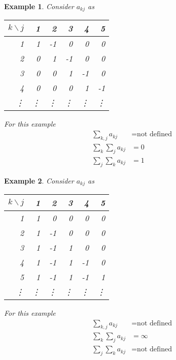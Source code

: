 \documentclass[11pt]{report}
\newtheorem{example}{Example}
\begin{document}
\begin{example}
Consider $a_{kj}$ as
\begin{center}
\begin{tabular}{|r|rrrrr|}
\hline
 $k\backslash j$&1&2&3&4&5\\
\hline
1&1&-1& 0&0&0 \\
2& 0&1&-1 &0&0\\
3& 0& 0&1&-1&0\\
4&0& 0& 0&1&-1\\
\vdots& \vdots&\vdots &\vdots &\vdots&\vdots \\
\hline
\end{tabular}
\end{center}
For this example
\begin{align*}
\sum_{k,j}a_{kj} &= \text{not defined} \\
\sum_k\sum_j a_{kj} &= 0 \\
\sum_j\sum_k a_{kj} &= 1
\end{align*}
\end{example}


\begin{example}
Consider $a_{kj}$ as
\begin{center}
\begin{tabular}{|r|rrrrr|}
\hline
 $k\backslash j$&1&2&3&4&5\\
\hline
1 & 1 &  0 &  0 &   0 &  0 \\
2 & 1 & -1 &  0 &   0 &  0 \\
3 & 1 & -1 &  1 &   0 &  0 \\
4 & 1 & -1 &  1 &  -1 &  0 \\
5 & 1 & -1 &  1 &  -1 &  1 \\
\vdots& \vdots&\vdots &\vdots &\vdots&\vdots \\
\hline
\end{tabular}
\end{center}
For this example
\begin{align*}
\sum_{k,j}a_{kj} &= \text{not defined} \\
\sum_k\sum_j a_{kj} &=  \infty \\
\sum_j\sum_k a_{kj} &= \text{not defined}
\end{align*}
\end{example}
\end{document}
